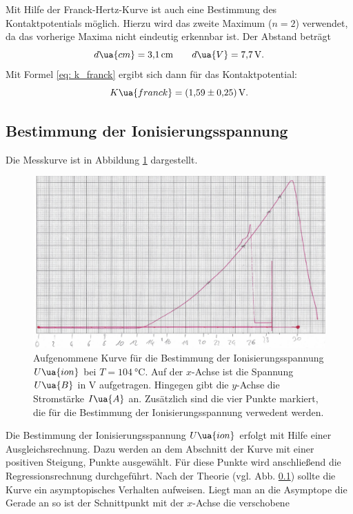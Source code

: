 Mit Hilfe der Franck-Hertz-Kurve ist auch eine Bestimmung des Kontaktpotentials
möglich. Hierzu wird das zweite Maximum ($n=2$) verwendet, da das vorherige Maxima
nicht eindeutig erkennbar ist. Der Abstand beträgt
\begin{equation*}
  d\ua{cm}=\SI{3.1}{\centi\meter} \qquad d\ua{V}=\SI{7.7}{\volt}.
\end{equation*}
Mit Formel \eqref{eq: k_franck} ergibt sich dann für das Kontaktpotential:
\begin{equation}
  \label{eq:k_frank}
  K\ua{franck}= \SI{1.59\pm0.25}{\volt}.
\end{equation}
\FloatBarrier
\subsection{Bestimmung der Ionisierungsspannung}
\FloatBarrier
Die Messkurve ist in Abbildung \ref{fig: messkurve_ioni} dargestellt.
\begin{figure}
  \centering
  \includegraphics[width=0.8 \textwidth]{./pics/ionisierungsenergie.png}
  \caption{Aufgenommene Kurve für die Bestimmung der Ionisierungsspannung $U\ua{ion}$ bei $T=\SI{104}{\celsius}$. Auf der $x$-Achse ist die Spannung $U\ua{B}$ in $\si{\volt}$ aufgetragen.
          Hingegen gibt die $y$-Achse die Stromstärke $I\ua{A}$ an. Zusätzlich sind die vier Punkte markiert, die für die Bestimmung der Ionisierungsspannung verwedent werden.}
  \label{fig: messkurve_ioni}
\end{figure}
Die Bestimmung der Ionisierungsspannung $U\ua{ion}$ erfolgt mit Hilfe einer Ausgleichsrechnung. Dazu werden an dem Abschnitt der Kurve mit einer positiven Steigung,
Punkte ausgewählt. Für diese Punkte wird anschließend die Regressionsrechnung durchgeführt.
Nach der Theorie (vgl. Abb. \ref{}) sollte die Kurve ein asymptopisches Verhalten aufweisen.
Liegt man an die Asymptope die Gerade an so ist der Schnittpunkt mit der $x$-Achse die verschobene
